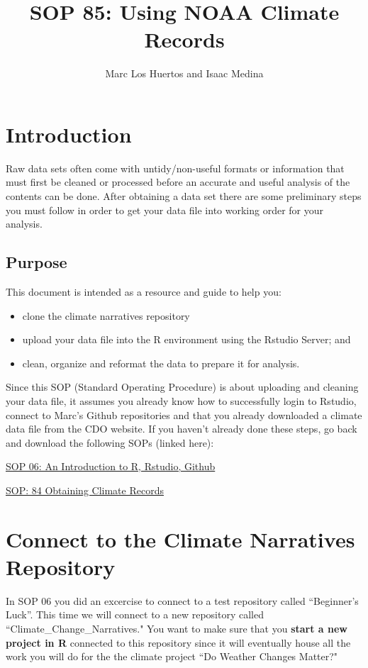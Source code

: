 \documentclass{article}\usepackage[]{graphicx}\usepackage[]{color}
\title{SOP 85: Using NOAA Climate Records}
\author{Marc Los Huertos and Isaac Medina}
\begin{document}
\maketitle

\section{Introduction}
Raw data sets often come with untidy/non-useful formats or information that must first be cleaned or processed before an accurate and useful analysis of the contents can be done. After obtaining a data set there are some preliminary steps you must follow in order to get your data file into working order for your analysis. 

\subsection{Purpose}
This document is intended as a resource and guide to help you: 
\begin{itemize}
\item clone the climate narratives repository
\item upload your data file into the R environment using the Rstudio Server; and 
\item clean, organize and reformat the data to prepare it for analysis. 
\end{itemize}
Since this SOP (Standard Operating Procedure) is about uploading and cleaning your data file, it assumes you already know how to successfully login to Rstudio, connect to Marc's Github repositories and that you already downloaded a climate data file from the CDO website. If you haven't already done these steps, go back and download the following SOPs (linked here): 

\href{https://github.com/marclos/SOPs/raw/master/06_Rstudio_Github/Rstudio-and-Github_v03.pdf}{SOP 06: An Introduction to R, Rstudio, Github} 

\href{https://github.com/marclos/Climate_Change_Narratives/blob/master/Analysis_SOPs/SOP84_Obtaining_Climate_Records.pdf}{SOP: 84 Obtaining Climate Records}

\section{Connect to the Climate Narratives Repository}

In SOP 06 you did an excercise to connect to a test repository called ``Beginner's Luck''. This time we will connect to a new repository called ``Climate\_Change\_Narratives." You want to make sure that you \textbf{start a new project in R} connected to this repository since it will eventually house all the work you will do for the the climate project ``Do Weather Changes Matter?" 
\end{document}
